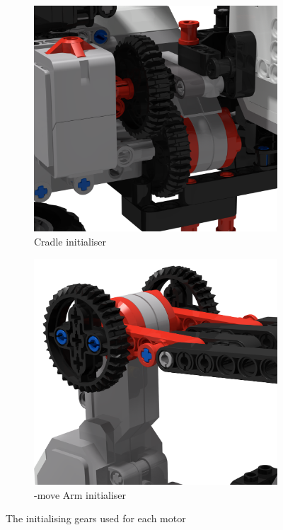 \documentclass{report}
\newcommand{\move}[1]{\uppercase{\texttt{\formatmovesnospace{#1}}}-move}
\begin{document}
\begin{figure}[H]
\begin{subfigure}[b]{0.25\textwidth}
			\includegraphics[width=\textwidth]{Resources/Images/rdrInitialiser2.png}
			\caption{Cradle initialiser}
			\label{fig:rdrInitialiser2}
		\end{subfigure}
		\hspace{10mm}
		\begin{subfigure}[b]{0.25\textwidth}
			\includegraphics[width=\textwidth]{Resources/Images/rdrInitialiser3.png}
			\caption{\move{x} Arm initialiser}
			\label{fig:rdrInitialiser3}
		\end{subfigure}
		\caption{The initialising gears used for each motor}
		\label{fig:rdrInitialiser}
	\end{figure}
	
\end{document}
